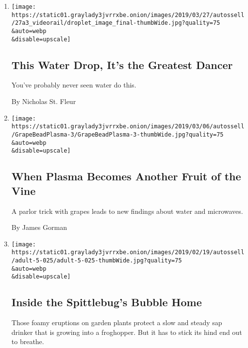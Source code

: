 \begin{enumerate}
\def\labelenumi{\arabic{enumi}.}
\item
  \href{/2019/03/26/science/water-droplets-dance.html}{}

  \texttt{[image: https://static01.graylady3jvrrxbe.onion/images/2019/03/27/autossell/27a3\_videorail/droplet\_image\_final-thumbWide.jpg?quality=75\\\&auto=webp\\\&disable=upscale]}

  \hypertarget{this-water-drop-its-the-greatest-dancer}{%
  \subsection{This Water Drop, It's the Greatest
  Dancer}\label{this-water-drop-its-the-greatest-dancer}}

  You've probably never seen water do this.

  By Nicholas St. Fleur
\item
  \href{/2019/03/05/science/microwave-grapes-plasma.html}{}

  \texttt{[image: https://static01.graylady3jvrrxbe.onion/images/2019/03/06/autossell/GrapeBeadPlasma-3/GrapeBeadPlasma-3-thumbWide.jpg?quality=75\\\&auto=webp\\\&disable=upscale]}

  \hypertarget{when-plasma-becomes-another-fruit-of-the-vine}{%
  \subsection{When Plasma Becomes Another Fruit of the
  Vine}\label{when-plasma-becomes-another-fruit-of-the-vine}}

  A parlor trick with grapes leads to new findings about water and
  microwaves.

  By James Gorman
\item
  \href{/2019/02/19/science/spittlebugs-bubble-home.html}{}

  \texttt{[image: https://static01.graylady3jvrrxbe.onion/images/2019/02/19/autossell/adult-5-025/adult-5-025-thumbWide.jpg?quality=75\\\&auto=webp\\\&disable=upscale]}

  \hypertarget{inside-the-spittlebugs-bubble-home}{%
  \subsection{Inside the Spittlebug's Bubble
  Home}\label{inside-the-spittlebugs-bubble-home}}

  Those foamy eruptions on garden plants protect a slow and steady sap
  drinker that is growing into a froghopper. But it has to stick its
  hind end out to breathe.


\end{enumerate}
